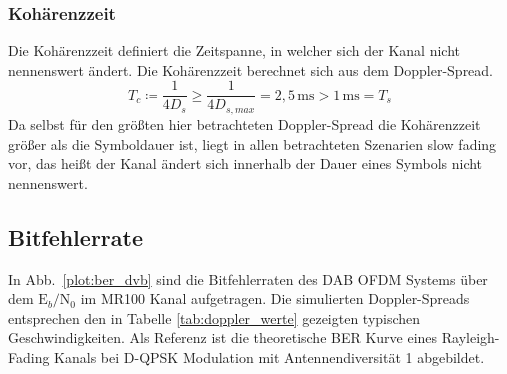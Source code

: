 \subsubsection{Kohärenzzeit}
Die Kohärenzzeit definiert die Zeitspanne, in welcher sich der Kanal nicht nennenswert ändert. Die Kohärenzzeit berechnet sich aus dem Doppler-Spread.
\begin{equation}
T_{c} \coloneqq \frac{1}{4 D_s} \geq \frac{1}{4 D_{s,max}} = 2,5\, \text{ms} > 1\, \text{ms} = T_s
\end{equation}
Da selbst für den größten hier betrachteten Doppler-Spread die Kohärenzzeit größer als die Symboldauer ist, liegt in allen betrachteten Szenarien slow fading vor, das heißt der Kanal ändert sich innerhalb der Dauer eines Symbols nicht nennenswert.

\subsection{Bitfehlerrate}
In Abb.~\ref{plot:ber_dvb} sind die Bitfehlerraten des DAB OFDM Systems über dem $\text{E}_b/\text{N}_0$ im MR100 Kanal aufgetragen. Die simulierten Doppler-Spreads entsprechen den in Tabelle \ref{tab:doppler_werte} gezeigten typischen Geschwindigkeiten. Als Referenz ist die theoretische BER Kurve eines Rayleigh-Fading Kanals bei D-QPSK Modulation mit Antennendiversität 1 abgebildet.

